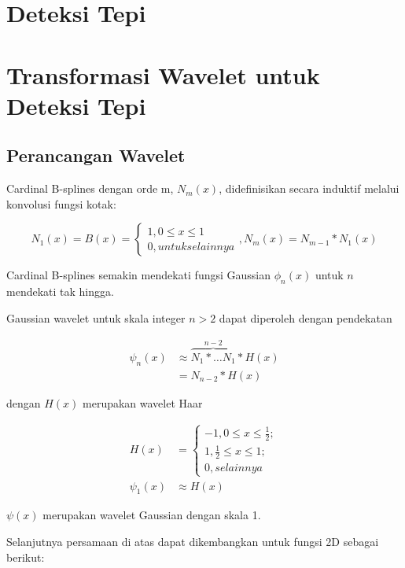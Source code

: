 \documentclass[laporan.tex]{subfiles}
\begin{document}
\section{Deteksi Tepi}


\section{Transformasi Wavelet untuk Deteksi Tepi}

\subsection{Perancangan Wavelet}

Cardinal B-splines dengan orde m, $N_m(x)$, didefinisikan secara induktif melalui konvolusi fungsi kotak:

\begin{equation}
	N_1(x)=B(x)=\begin{cases}
		1, 0 \leq x \leq 1 \\
		0, untuk selainnya
	\end{cases} ,
	N_m(x)=N_{m-1} \ast N_1(x)
\end{equation}

Cardinal B-splines semakin mendekati fungsi Gaussian $\phi_n(x)$ untuk $n$ mendekati tak hingga.

Gaussian wavelet untuk skala integer $n > 2$ dapat diperoleh dengan pendekatan

\begin{align}
	\psi_n(x) & \approx \overbrace{N_1 \ast \ldots  N_1}^{n-2} \ast H(x) \\
	& = N_{n-2} \ast H(x)
\end{align}

dengan $H(x)$ merupakan wavelet Haar

\begin{align}
	H(x) & = \begin{cases}
		-1, 0 \leq x \leq \frac{1}{2}; \\
		1, \frac{1}{2} \leq x \leq 1; \\
		0, selainnya
	\end{cases} \\
	\psi_1(x) & \approx H(x)
\end{align}

$\psi(x)$ merupakan wavelet Gaussian dengan skala 1.

Selanjutnya persamaan di atas dapat dikembangkan untuk fungsi 2D sebagai berikut:
\end{document}
